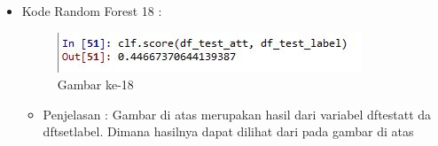 \begin{enumerate}
\begin{itemize}
\begin{itemize}
\begin{itemize}
\begin{itemize}
\par
\end{itemize}
\item Kode Random Forest 18 :
\par
\begin{figure}[ht]
\centering
\includegraphics[scale=0.7]{figures/hmm/cod18.jpg}
\caption{Gambar ke-18}
\label{contoh}
\end{figure}
\par
\begin{itemize}
\item Penjelasan : Gambar di atas merupakan hasil dari variabel dftestatt da dftsetlabel. Dimana hasilnya dapat dilihat dari pada gambar di atas
\par
\par
\end{itemize}

\end{itemize}



\end{itemize}
\end{itemize}
\end{enumerate}
